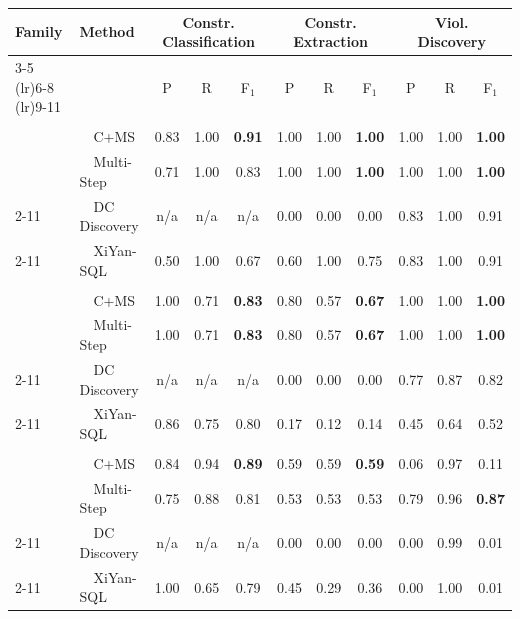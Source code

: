 \begin{tabular}{llccccccccc}
\toprule
\textbf{Family} & \textbf{Method} & \multicolumn{3}{c}{Constr. Classification} & \multicolumn{3}{c}{Constr. Extraction} & \multicolumn{3}{c}{Viol. Discovery} \\
\cmidrule(lr){3-5}  \cmidrule(lr){6-8}  \cmidrule(lr){9-11}
 &  & P & R & F$_1$ & P & R & F$_1$ & P & R & F$_1$ \\
\midrule
\addlinespace[2pt]
\multicolumn{11}{c}{\textbf{Hospital}} \\
\addlinespace[1pt]
\multirow{2}{*}{\system} & ~~C+MS & 0.83 & 1.00 & \textbf{0.91} & 1.00 & 1.00 & \textbf{1.00} & 1.00 & 1.00 & \textbf{1.00} \\
 & ~~Multi-Step & 0.71 & 1.00 & 0.83 & 1.00 & 1.00 & \textbf{1.00} & 1.00 & 1.00 & \textbf{1.00} \\
\cmidrule(l){2-11}
\multirow{1}{*}{Profiling} & ~~DC Discovery & n/a & n/a & n/a & 0.00 & 0.00 & 0.00 & 0.83 & 1.00 & 0.91 \\
\cmidrule(l){2-11}
\multirow{1}{*}{Text2SQL} & ~~XiYan-SQL & 0.50 & 1.00 & 0.67 & 0.60 & 1.00 & 0.75 & 0.83 & 1.00 & 0.91 \\
\midrule
\addlinespace[2pt]
\multicolumn{11}{c}{\textbf{Restaurant}} \\
\addlinespace[1pt]
\multirow{2}{*}{\system} & ~~C+MS & 1.00 & 0.71 & \textbf{0.83} & 0.80 & 0.57 & \textbf{0.67} & 1.00 & 1.00 & \textbf{1.00} \\
 & ~~Multi-Step & 1.00 & 0.71 & \textbf{0.83} & 0.80 & 0.57 & \textbf{0.67} & 1.00 & 1.00 & \textbf{1.00} \\
\cmidrule(l){2-11}
\multirow{1}{*}{Profiling} & ~~DC Discovery & n/a & n/a & n/a & 0.00 & 0.00 & 0.00 & 0.77 & 0.87 & 0.82 \\
\cmidrule(l){2-11}
\multirow{1}{*}{Text2SQL} & ~~XiYan-SQL & 0.86 & 0.75 & 0.80 & 0.17 & 0.12 & 0.14 & 0.45 & 0.64 & 0.52 \\
\midrule
\addlinespace[2pt]
\multicolumn{11}{c}{\textbf{SISU}} \\
\addlinespace[1pt]
\multirow{2}{*}{\system} & ~~C+MS & 0.84 & 0.94 & \textbf{0.89} & 0.59 & 0.59 & \textbf{0.59} & 0.06 & 0.97 & 0.11 \\
 & ~~Multi-Step & 0.75 & 0.88 & 0.81 & 0.53 & 0.53 & 0.53 & 0.79 & 0.96 & \textbf{0.87} \\
\cmidrule(l){2-11}
\multirow{1}{*}{Profiling} & ~~DC Discovery & n/a & n/a & n/a & 0.00 & 0.00 & 0.00 & 0.00 & 0.99 & 0.01 \\
\cmidrule(l){2-11}
\multirow{1}{*}{Text2SQL} & ~~XiYan-SQL & 1.00 & 0.65 & 0.79 & 0.45 & 0.29 & 0.36 & 0.00 & 1.00 & 0.01 \\

\end{tabular}
